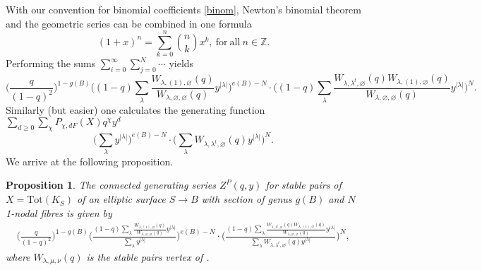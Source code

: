\documentclass[12pt]{amsart}
\newtheorem{proposition}[theorem]{Proposition}
\theoremstyle{definition}
\theoremstyle{property}
\newcommand\Z{\mathbb Z}
\renewcommand\_{^{}_}
\begin{document}
With our convention for binomial coefficients \eqref{binom}, Newton's binomial theorem and the geometric series can be combined in one formula
\[
(1+x)^n = \sum_{k =0}^{n} \binom{n}{k} x^k, \ \mathrm{for \ all \ } n \in \Z.
\]
Performing the sums $\sum_{i = 0}^{\infty} \sum_{j=0}^{N} \cdots$ yields
\[
\bigg( \frac{q}{(1-q)^2} \bigg)^{1-g(B)} \Bigg( (1-q) \sum_{\lambda} \frac{W_{\lambda, (1), \varnothing}(q)}{W_{\lambda,\varnothing,\varnothing}(q)} y^{|\lambda|} \Bigg)^{e(B) - N} \cdot \Bigg( (1-q) \sum_{\lambda} \frac{W_{\lambda, \lambda^{t}, \varnothing}(q) W_{\lambda, (1), \varnothing}(q)}{W_{\lambda,\varnothing,\varnothing}(q)} y^{|\lambda|} \Bigg)^{N}.
\]
Similarly (but easier) one calculates the generating function $\sum_{d \geq 0} \sum_{\chi} P_{\chi,dF}(X) q^{\chi} y^d$
\[
\Bigg( \sum_{\lambda} y^{|\lambda|} \Bigg)^{e(B) - N} \cdot \Bigg( \sum_{\lambda} W_{\lambda, \lambda^{t}, \varnothing}(q) y^{|\lambda|} \Bigg)^{N}.
\]
We arrive at the following proposition.
\begin{proposition} \label{mainprop}
The connected generating series $Z^{P}(q,y)$ for stable pairs of $X = \mathrm{Tot}(K_S)$ of an elliptic surface $S \rightarrow B$ with section of genus $g(B)$ and $N$ 1-nodal fibres is given by
\begin{align*}
\bigg( \frac{q}{(1-q)^2} \bigg)^{1-g(B)} \Bigg( \frac{(1-q) \sum_{\lambda} \frac{W_{\lambda, (1), \varnothing}(q)}{W_{\lambda,\varnothing,\varnothing}(q)} y^{|\lambda|}}{\sum_{\lambda} y^{|\lambda|}} \Bigg)^{e(B) - N} \cdot \Bigg( \frac{(1-q) \sum_{\lambda} \frac{W_{\lambda, \lambda^{t}, \varnothing}(q) W_{\lambda, (1), \varnothing}(q)}{W_{\lambda,\varnothing,\varnothing}(q)} y^{|\lambda|}}{\sum_{\lambda} W_{\lambda, \lambda^{t}, \varnothing}(q) y^{|\lambda|}} \Bigg)^{N},
\end{align*}
where $W_{\lambda, \mu, \nu}(q)$ is the stable pairs vertex of \cite{Pandharipande-Thomas2}.
\end{proposition}
\end{document}
